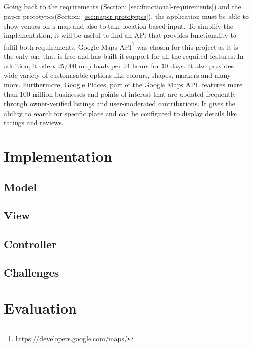 \documentclass{l4proj}
\begin{document}
\paragraph{}
Going back to the requirements (Section: \ref{sec:functional-requirements}) and the paper prototypes(Section: \ref{sec:paper-prototypes}), the application must be able to show venues on a map and also to take location based input. To simplify the implementation, it will be useful to find an API that provides functionality to fulfil both requirements. Google Maps API\footnote{\url{https://developers.google.com/maps/}} was chosen for this project as it is the only one that is free and has built it support for all the required features. In addition, it offers 25,000 map loads per 24 hours for 90 days\cite{mapusage}. It also provides wide variety of customisable options like colours, shapes, markers and many more. Furthermore, Google Places\cite{mapplace}, part of the Google Maps API, features more than 100 million businesses and points of interest that are updated frequently through owner-verified listings and user-moderated contributions. It gives the ability to search for specific place and can be configured to display details like ratings and reviews.


\chapter{Implementation}

\section{Model}

\section{View}

\section{Controller}

\section{Challenges}

\chapter{Evaluation}
\end{document}
